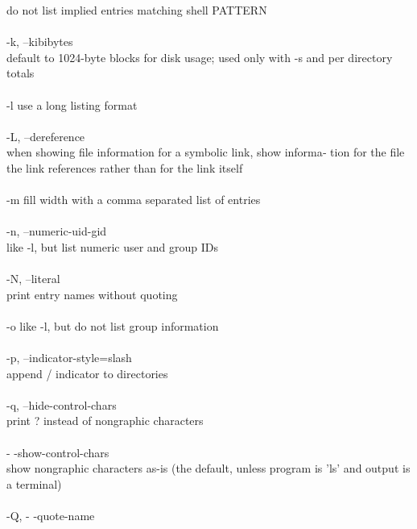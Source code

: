\documentclass{article}
\begin{document}
\tabto{2cm}              do not list implied entries matching shell PATTERN \\
\\
\tabto{1cm}       -k, --kibibytes \\
\tabto{2cm}              default  to  1024-byte  blocks for disk usage; used only with -s
\tabto{2cm}              and per directory totals \\
\\
\tabto{1cm}       -l     use a long listing format \\
\\
\tabto{1cm}       -L, --dereference \\
\tabto{2cm}              when showing file information for a symbolic link, show informa‐
\tabto{2cm}              tion  for  the file the link references rather than for the link
\tabto{1cm}              itself \\
\\
\tabto{1cm}       -m     fill width with a comma separated list of entries \\
\\
\tabto{1cm}       -n, --numeric-uid-gid \\
\tabto{2cm}              like -l, but list numeric user and group IDs \\
\\
\tabto{1cm}       -N, --literal \\
\tabto{2cm}              print entry names without quoting \\
\\
\tabto{1cm}       -o     like -l, but do not list group information \\
\\
\tabto{1cm}       -p, --indicator-style=slash \\
\tabto{2cm}              append / indicator to directories \\
\\
\tabto{1cm}       -q, --hide-control-chars \\
\tabto{2cm}             print ? instead of nongraphic characters \\
\\
\tabto{1cm}       - -show-control-chars \\
\tabto{2cm}              show nongraphic characters as-is (the default, unless program is
\tabto{2cm}              'ls' and output is a terminal) \\
\\
\tabto{1cm}       -Q, - -quote-name \\
\end{document}
